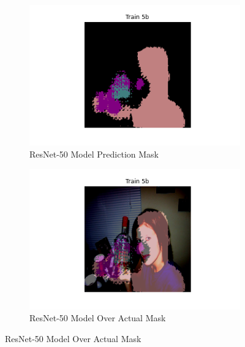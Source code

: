 \documentclass{article}
\begin{document}
\begin{figure}[h!]
  \centering
  \begin{subfigure}[b]{0.45\textwidth}
      \centering
      \includegraphics[width=\textwidth]{include/plots/train_5_b_pred.png}
      \caption{ResNet-50 Model Prediction Mask}
      \label{fig:resnet50_msk}
  \end{subfigure}
  \hfill %
  \begin{subfigure}[b]{0.45\textwidth}
      \centering
      \includegraphics[width=\textwidth]{include/plots/train_5_b_over_actual.png} %
      \caption{ResNet-50 Model Over Actual Mask}
      \label{fig:resnet50_over_actual}
  \end{subfigure}
  \label{fig:resnet50_masks_visualization}
\end{figure}
\end{document}
